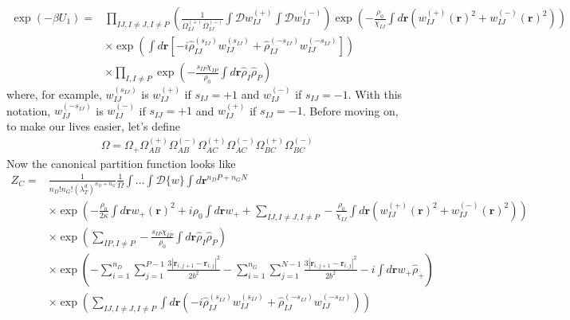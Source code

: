 \documentclass{article}
\begin{document}
\begin{align*}
  \exp (-\beta U_1) =&
    \prod_{IJ, I \ne J, I \ne P} \left(
      \frac{1}{\Omega_{IJ}^{(+)}\Omega_{IJ}^{(-)}}
      \int \mathcal{D} w_{IJ}^{(+)} \int \mathcal{D} w_{IJ}^{(-)}
    \right)
    \exp \left(
      -\frac{\rho_0}{\chi_{IJ}}
      \int d \mathbf{r} \left( 
        w_{IJ}^{(+)}(\mathbf{r})^2 + w_{IJ}^{(-)}(\mathbf{r})^2
      \right)
    \right) \\
    &\times
    \exp \left(
      \int d \mathbf{r} \left[ 
        - i \hat{\rho}_{IJ}^{(s_{IJ})} w_{IJ}^{(s_{IJ})}
        + \hat{\rho}_{IJ}^{(-s_{IJ})} w_{IJ}^{(-s_{IJ})}
      \right]
    \right) \\
    &\times
    \prod_{I, I \ne P} \exp \left(
      - \frac{s_{IP}\chi_{IP}}{\rho_0}
      \int d \mathbf{r} \hat{\rho}_I \hat{\rho}_P
    \right)
\end{align*}
where, for example, $w_{IJ}^{(s_{IJ})}$ is $w_{IJ}^{(+)}$ if $s_{IJ} = +1$ and
  $w_{IJ}^{(-)}$ if $s_{IJ} = -1$.
With this notation, $w_{IJ}^{(-s_{IJ})}$ is $w_{IJ}^{(-)}$ if $s_{IJ} = +1$ and
  $w_{IJ}^{(+)}$ if $s_{IJ} = -1$.
Before moving on, to make our lives easier, let's define
\begin{align*}
  \Omega =
    \Omega_+
    \Omega_{AB}^{(+)} \Omega_{AB}^{(-)}
    \Omega_{AC}^{(+)} \Omega_{AC}^{(-)}
    \Omega_{BC}^{(+)} \Omega_{BC}^{(-)}
\end{align*}
Now the canonical partition function looks like
\begin{align*}
  Z_C =& \frac{1}{n_D!n_G! \left( \lambda_T^d \right)^{n_D+n_G}}
    \frac{1}{\Omega}
    \int \hdots \int \mathcal{D} \{w\}
    \int d \mathbf{r}^{n_D P + n_G N} \\
    &\times
    \exp \left(
      - \frac{\rho_0}{2\kappa} \int d \mathbf{r} w_+(\mathbf{r})^2
      + i \rho_0 \int d\mathbf{r} w_+
      + \sum_{IJ,I \ne J, I \ne P}
      - \frac{\rho_0}{\chi_{IJ}}
      \int d \mathbf{r}
      \left(
        w_{IJ}^{(+)} (\mathbf{r})^2 + w_{IJ}^{(-)} (\mathbf{r})^2
      \right)
    \right) \\
    &\times
    \exp \left(
      \sum_{IP,I \ne P}
      - \frac{s_{IP}\chi_{IP}}{\rho_0}
      \int d \mathbf{r} \hat{\rho}_I \hat{\rho}_P
    \right) \\
    &\times
    \exp \left(
      - \sum_{i=1}^{n_D} \sum_{j=1}^{P-1}
      \frac{3 \left| \mathbf{r}_{i,j+1} - \mathbf{r}_{i,j} \right| ^ 2 }
           { 2 b^2 }
      - \sum_{i=1}^{n_G} \sum_{j=1}^{N-1}
      \frac{3 \left| \mathbf{r}_{i,j+1} - \mathbf{r}_{i,j} \right| ^ 2 }
           { 2 b^2 }
      - i\int d \mathbf{r} w_+ \hat{\rho}_+
    \right) \\
    &\times
    \exp \left(
      \sum_{IJ, I \ne J, I \ne P}
      \int d \mathbf{r} \left(
        -i \hat{\rho}_{IJ}^{(s_{IJ})} w_{IJ}^{(s_{IJ})}
        + \hat{\rho}_{IJ}^{(-s_{IJ})} w_{IJ}^{(-s_{IJ})}
      \right)
    \right)
\end{align*}
\end{document}
